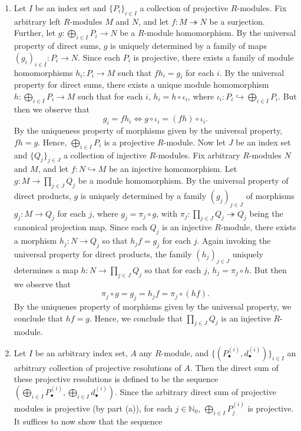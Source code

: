 \documentclass{article}
\newcommand{\embedd}{\hookrightarrow}
\begin{document}
	\vspace{-0.25cm}
	\begin{enumerate}[itemsep =-2pt,label = (\alph{*})]
		\item Let $I$ be an index set and $\{P_{i}\}_{i \in I}$ a collection of projective $R$-modules. Fix arbitrary left $R$-modules $M$ and $N$, and let $f: M \twoheadrightarrow N$ be a surjection. Further, let $g: \bigoplus_{i \in I}P_{i} \to N$ be a $R$-module homomorphism. By the universal property of direct sums, $g$ is uniquely determined by a family of maps $(g_{i})_{i \in I}: P_{i} \to N$. Since each $P_{i}$ is projective, there exists a family of module homomorphisms $h_{i}: P_{i} \to M$ such that $fh_{i} = g_{i}$ for each $i$. By the universal property for direct sums, there exists a unique module homomorphism $h: \bigoplus_{i \in I}P_{i} \to M$ such that for each $i$, $h_{i} = h \circ \iota_{i}$, where $\iota_{i}: P_{i} \embedd \bigoplus_{i \in I}P_{i}$. But then we observe that 
		\begin{equation*}
			g_{i} = fh_{i} \iff g \circ \iota_{i} = (fh) \circ \iota_{i}. 
		\end{equation*}
		By the uniqueness property of morphisms given by the universal property, $fh = g$. Hence, $\bigoplus_{i \in I}P_{i}$ is a projective $R$-module. Now let $J$ be an index set and $\{Q_{j}\}_{j \in J}$ a collection of injective $R$-modules. Fix arbitrary $R$-modules $N$ and $M$, and let $f: N \embedd M$ be an injective homomorphism. Let $g: M \to \prod_{j \in J}Q_{j}$ be a module homomorphism. By the universal property of direct products, $g$ is uniquely determined by a family $(g_{j})_{j \in J}$ of morphisms $g_{j}: M \to Q_{j}$ for each $j$, where $g_{j} = \pi_{j} \circ g$, with $\pi_{j}: \prod_{j \in J}Q_{j} \twoheadrightarrow Q_{j}$ being the canonical projection map. Since each $Q_{j}$ is an injective $R$-module, there exists a morphism $h_{j}: N \to Q_{j}$ so that $h_{j}f = g_{j}$ for each $j$. Again invoking the universal property for direct products, the family $(h_{j})_{j \in J}$ uniquely determines a map $h: N \to \prod_{j \in J}Q_{j}$ so that for each $j$, $h_{j} = \pi_{j} \circ h$. But then we observe that 
		\begin{equation*}
			\pi_{j} \circ g = g_{j}  = h_{j}f = \pi_{j} \circ (hf). 
		\end{equation*}
		By the uniquenes property of morphisms given by the universal property, we conclude that $hf = g$. Hence, we conclude that $\prod_{j \in J}Q_{j}$ is an injective $R$-module. 
		\item Let $I$ be an arbitrary index set, $A$ any $R$-module, and $\{(P^{(i)}_{\bullet}, d^{(i)}_{\bullet})\}_{i \in I}$ an arbitrary collection of projective resolutions of $A$. Then the direct sum of these projective resolutions is defined to be the sequence $\left(\bigoplus_{i \in I}P^{(i)}_{\bullet}, \bigoplus_{i \in I}d^{(i)}_{\bullet}\right)$. Since the arbitrary direct sum of projective modules is projective (by part (a)), for each $j \in \mathbb{N}_{0}$, $\bigoplus_{i \in I}P^{(i)}_{j}$ is projective. It suffices to now show that the sequence 

\end{enumerate}
\end{document}
